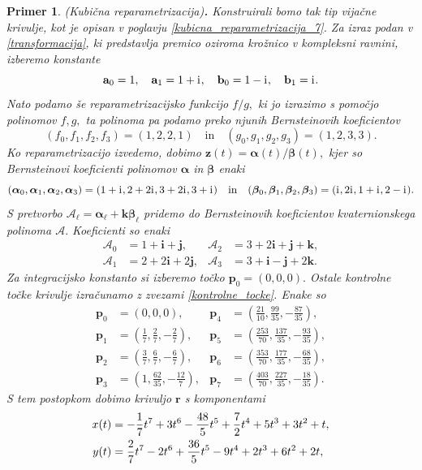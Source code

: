 \documentclass[12pt,a4paper,twoside]{article}
\newcommand{\iu}{\mathrm{i}\mkern1mu} %
\theoremstyle{definition} %
\theoremstyle{plain} %
\theoremstyle{primerstyle}
\newtheorem{primer}[definicija]{Primer}
\numberwithin{equation}{section}  %
\newcommand{\aV}{\mathbf{a}}
\newcommand{\bV}{\mathbf{b}}
\newcommand{\pV}{\mathbf{p}}
\newcommand{\rV}{\mathbf{r}}
\newcommand{\iV}{\mathbf{i}}
\newcommand{\jV}{\mathbf{j}}
\newcommand{\kV}{\mathbf{k}}
\newcommand{\zV}{\mathbf{z}}
\newcommand{\AQ}{\mathcal{A}}
\newcommand{\balpha}{\boldsymbol \alpha}
\newcommand{\bbeta}{\boldsymbol \beta}
\begin{document}
\begin{primer}
	\label{primer1}
	\textnormal{ }(Kubična reparametrizacija)\textbf{.}
	Konstruirali bomo tak tip vijačne krivulje, kot je opisan v poglavju \ref{kubicna_reparametrizacija_7}. Za izraz podan v \eqref{transformacija}, ki predstavlja premico oziroma krožnico v kompleksni ravnini, izberemo konstante
	\begin{equation*}
		\aV_0=1,\quad\aV_1=1+\iu,\quad\bV_0=1-\iu,\quad\bV_1=\iu.
	\end{equation*}
	Nato podamo še reparametrizacijsko funkcijo $f/g,$ ki jo izrazimo s pomočjo polinomov $f,g,$ ta polinoma pa podamo preko njunih Bernsteinovih koeficientov $$(f_0,f_1,f_2,f_3)=(1,2,2,1)\quad\text{in}\quad(g_0,g_1,g_2,g_3)=(1,2,3,3).$$ Ko reparametrizacijo izvedemo, dobimo $\zV(t)=\balpha(t)/\bbeta(t),$ kjer so Bernsteinovi koeficienti polinomov $\balpha$ in $\bbeta$ enaki $$(\balpha_0,\balpha_1,\balpha_2,\balpha_3)=(1+\iu,2+2\iu,3+2\iu,3+\iu)\quad\text{in}\quad(\bbeta_0,\bbeta_1,\bbeta_2,\bbeta_3)=(\iu,2\iu,1+\iu,2-\iu).$$ S pretvorbo $\AQ_\ell=\balpha_\ell+\kV\bbeta_\ell$ pridemo do Bernsteinovih koeficientov kvaternionskega polinoma $\AQ.$ Koeficienti so enaki
	\begin{align*}
		\AQ_0&=1+\iV+\jV,&\AQ_2&=3+2\iV+\jV+\kV,\\
		\AQ_1&=2+2\iV+2\jV,&\AQ_3&=3+\iV-\jV+2\kV.
	\end{align*}
	Za integracijsko konstanto si izberemo točko $\pV_0=(0,0,0).$ Ostale kontrolne točke krivulje izračunamo z zvezami \eqref{kontrolne_tocke}. Enake so
	\begin{align*}
		\pV_0&=(0,0,0),&\pV_4&=\left(\frac{21}{10},\frac{99}{35},-\frac{87}{35}\right)\!,\\
		\pV_1&=\left(\frac{1}{7},\frac{2}{7},-\frac{2}{7}\right)\!,&\pV_5&=\left(\frac{253}{70},\frac{137}{35},-\frac{93}{35}\right)\!,\\
		\pV_2&=\left(\frac{3}{7},\frac{6}{7},-\frac{6}{7}\right)\!,&\pV_6&=\left(\frac{353}{70},\frac{177}{35},-\frac{68}{35}\right)\!,\\
		\pV_3&=\left(1,\frac{62}{35},-\frac{12}{7}\right)\!,&\pV_7&=\left(\frac{403}{70},\frac{227}{35},-\frac{18}{35}\right)\!.
	\end{align*}
	S tem postopkom dobimo krivuljo $\rV$ s komponentami
	\begin{align}
		x(t)&=-\frac{1}{7}t^7+3t^6-\frac{48}{5}t^5+\frac{7}{2}t^4+5t^3+3t^2+t,\notag\\
		y(t)&=\frac{2}{7}t^7-2t^6+\frac{36}{5}t^5-9t^4+2t^3+6t^2+2t,\label{primer1_krivulja}\\

\end{align}
\end{primer}
\end{document}
